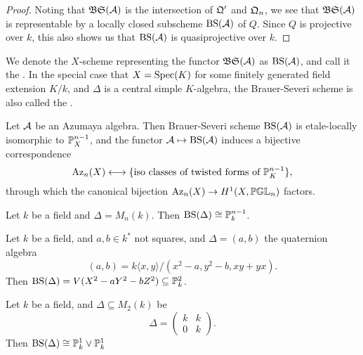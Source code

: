 \begin{proof}
Noting that $\mathfrak{BS}(\mathcal{A})$ is the intersection of $\mathfrak{Q}'$ and $\mathfrak{Q}_n$, we see that $\mathfrak{BS}(\mathcal{A})$ is representable by a locally closed subscheme $\textnormal{BS}(\mathcal{A})$ of $Q$.  Since $Q$ is projective over $k$, this also shows us that $\textnormal{BS}(\mathcal{A})$ is quasiprojective over $k$.
\end{proof}

\begin{defn}
We denote the $X$-scheme representing the functor $\mathfrak{BS}(\mathcal{A})$ as $\textnormal{BS}(\mathcal{A})$, and call it the .  In the special case that $X=\textnormal{Spec}(K)$ for some finitely generated field extension $K/k$, and $\Delta$ is a central simple $K$-algebra, the Brauer-Severi scheme is also called the .
\end{defn}

\begin{prop}
Let $\mathcal{A}$ be an Azumaya algebra.  Then Brauer-Severi scheme $\textnormal{BS}(\mathcal{A})$ is etale-locally isomorphic to $\mathbb{P}_X^{n-1}$, and the functor $\mathcal{A}\mapsto \textnormal{BS}(\mathcal{A})$ induces a bijective correspondence
$$\textnormal{Az}_n(X)\longleftrightarrow \{\text{iso classes of twisted forms of $\mathbb{P}^{n-1}_K$}\},$$
through which the canonical bijection $\textnormal{Az}_n(X)\rightarrow H^1(X,\mathbb{PGL}_n)$ factors.
\end{prop}

\begin{ex}
Let $k$ be a field and $\Delta = M_n(k)$.  Then $\textnormal{BS}(\Delta) \cong \mathbb{P}_k^{n-1}$.
\end{ex}

\begin{ex}
Let $k$ be a field, and $a,b\in k^*$ not squares, and $\Delta = (a,b)$ the quaternion algebra
$$(a,b) = k\langle x,y\rangle/(x^2-a,y^2-b,xy+yx).$$
Then $\textnormal{BS}(\Delta) = V(X^2-aY^2-bZ^2)\subseteq \mathbb{P}_k^2$.
\end{ex}

\begin{ex}
Let $k$ be a field, and $\Delta\subseteq M_2(k)$ be
$$\Delta = \left(\begin{array}{cc}
k & k\\
0 & k
\end{array}\right).$$
Then $\textnormal{BS}(\Delta) \cong \mathbb{P}^1_k\vee\mathbb{P}^1_k$
\end{ex}

